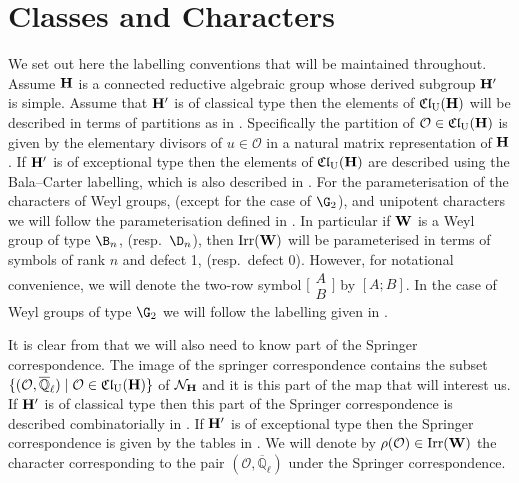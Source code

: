 \documentclass[eqthmnum]{jt-calcs}
\newcommand{\Clu}{\ensuremath{\mathfrak{Cl}_{\mathrm{U}}}}
\newcommand{\Ql}{\ensuremath{\overline{\mathbb{Q}}_{\ell}}}
\renewcommand{\cref}{\Cref}
\begin{document}
\section{Classes and Characters}\label{sec:classes-and-chars}
\begin{pa}\label{pa:classes-and-chars}
We set out here the labelling conventions that will be maintained throughout. Assume $\mathbf{H}$ is a connected reductive algebraic group whose derived subgroup $\mathbf{H}'$ is simple. Assume that $\mathbf{H}'$ is of classical type then the elements of $\Clu(\bH)$ will be described in terms of partitions as in \cite[\S13.1]{carter:1993:finite-groups-of-lie-type}. Specifically the partition of $\mathcal{O} \in \Clu(\bH)$ is given by the elementary divisors of $u \in \mathcal{O}$ in a natural matrix representation of $\mathbf{H}$. If $\mathbf{H}'$ is of exceptional type then the elements of $\Clu(\bH)$ are described using the Bala--Carter labelling, which is also described in \cite[\S13.1]{carter:1993:finite-groups-of-lie-type}. For the parameterisation of the characters of Weyl groups, (except for the case of $\G_2$), and unipotent characters we will follow the parameterisation defined in \cite[Chapter 4]{lusztig:1984:characters-of-reductive-groups}. In particular if $\mathbf{W}$ is a Weyl group of type $\B_n$, (resp.\ $\D_n$), then $\operatorname{Irr}(\mathbf{W})$ will be parameterised in terms of symbols of rank $n$ and defect 1, (resp.\ defect 0). However, for notational convenience, we will denote the two-row symbol $\bigl[\begin{smallmatrix} A \\ B \end{smallmatrix}\bigr]$ by $[A;B]$. In the case of Weyl groups of type $\G_2$ we will follow the labelling given in \cite[\S13.2]{carter:1993:finite-groups-of-lie-type}.

It is clear from \cref{prop:A} that we will also need to know part of the Springer correspondence. The image of the springer correspondence contains the subset $\{(\mathcal{O},\Ql) \mid \mathcal{O} \in \Clu(\bH)\}$ of $\mathcal{N}_{\mathbf{H}}$ and it is this part of the map that will interest us. If $\mathbf{H}'$ is of classical type then this part of the Springer correspondence is described combinatorially in \cite[\S2]{geck-malle:2000:existence-of-a-unipotent-support}. If $\mathbf{H}'$ is of exceptional type then the Springer correspondence is given by the tables in \cite[\S13.3]{carter:1993:finite-groups-of-lie-type}. We will denote by $\rho(\mathcal{O}) \in \operatorname{Irr}(\mathbf{W})$ the character corresponding to the pair $(\mathcal{O},\Ql)$ under the Springer correspondence.


\end{pa}
\end{document}
